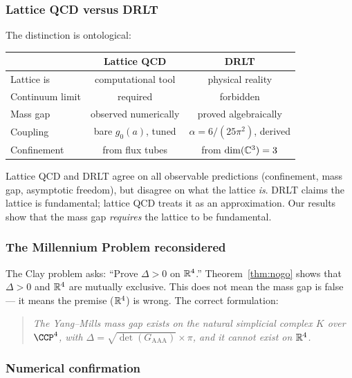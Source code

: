 \subsubsection{Lattice QCD versus DRLT}

The distinction is ontological:

\begin{center}
\begin{tabular}{lcc}
\hline
& Lattice QCD & DRLT \\
\hline
Lattice is & computational tool & physical reality \\
Continuum limit & required & forbidden \\
Mass gap & observed numerically & proved algebraically \\
Coupling & bare $g_0(a)$, tuned & $\alpha = 6/(25\pi^2)$, derived \\
Confinement & from flux tubes & from $\dim(\mathbb{C}^3) = 3$ \\
\hline
\end{tabular}
\end{center}

\noindent
Lattice QCD and DRLT agree on all observable predictions (confinement,
mass gap, asymptotic freedom), but disagree on what the lattice \emph{is}.
DRLT claims the lattice is fundamental; lattice QCD treats it as an
approximation. Our results show that the mass gap \emph{requires}
the lattice to be fundamental.

\subsubsection{The Millennium Problem reconsidered}

The Clay problem asks: ``Prove $\Delta > 0$ on $\mathbb{R}^4$.''
Theorem~\ref{thm:nogo} shows that $\Delta > 0$ and $\mathbb{R}^4$ are
mutually exclusive. This does not mean the mass gap is false --- it
means the premise ($\mathbb{R}^4$) is wrong. The correct formulation:

\begin{quote}
\emph{The Yang--Mills mass gap exists on the natural simplicial complex
$K$ over $\CCP^4$, with $\Delta = \sqrt{\det(G_{\mathrm{AAA}})}
\times \pi$, and it cannot exist on $\mathbb{R}^4$.}
\end{quote}

\subsubsection{Numerical confirmation}

